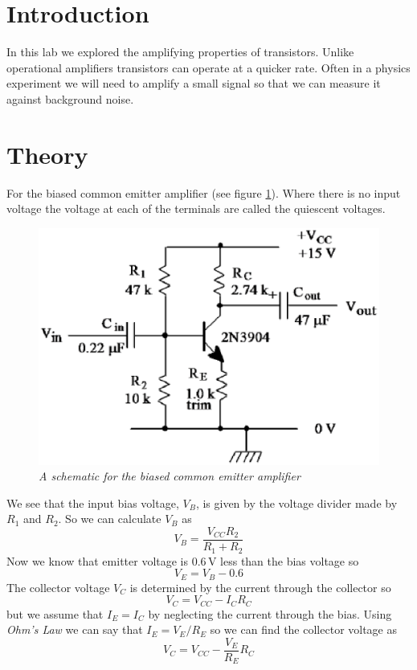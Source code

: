 \documentclass[11pt]{article}
\numberwithin{equation}{section}
\numberwithin{figure}{section}
\numberwithin{table}{section}
\newcommand{\unit}[1]{\ensuremath{\, \mathrm{#1}}}
\begin{document}


\section{Introduction}
In this lab we explored the amplifying properties of transistors. Unlike operational amplifiers transistors can operate at a quicker rate. Often in a physics experiment we will need to amplify a small signal so that we can measure it against background noise.

\section{Theory}
For the biased common emitter amplifier (see figure \ref{EmitAmp}). Where there is no input voltage the voltage at each of the terminals are called the quiescent voltages.
\begin{figure}[h]
\centering
\includegraphics[scale=0.50]{EmitAmpSch.eps}
\caption{\textit{A schematic for the biased common emitter amplifier}}
\label{EmitAmp}
\end{figure}
We see that the input bias voltage, $V_B$, is given by the voltage divider made by $R_1$ and $R_2$. So we can calculate $V_B$ as
\begin{equation}
V_B = \frac{V_{CC}R_2}{R_1+R_2}
\label{BiasVolt}
\end{equation}
Now we know that emitter voltage is $0.6\unit{V}$ less than the bias voltage so
\begin{equation}
V_E = V_B - 0.6
\label{EmitVolt}
\end{equation}
The collector voltage $V_C$ is determined by the current through the collector so
$$V_C = V_{CC}-I_CR_C$$
but we assume that $I_E = I_C$ by neglecting the current through the bias. Using \emph{Ohm's Law} we can say that $I_E = V_E/R_E$ so we can find the collector voltage as
\begin{equation}
V_C = V_{CC} - \frac{V_E}{R_E}R_C
\label{CollVolt}
\end{equation}
\end{document}
